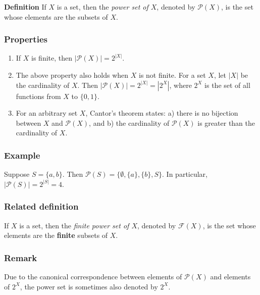 \documentclass[12pt]{article}
\newcommand{\powset}[1]{\mathcal{P}(#1)}
\begin{document}
{\bf Definition}
If $X$ is a set, then the \emph{power set of $X$}, denoted by  $\powset{X}$, is the
set whose elements are the subsets of $X$. 

\subsubsection*{Properties}
\begin{enumerate}
\item If $X$ is finite, then $|\powset{X}|=2^{|X|}$.
\item The above property also holds when $X$ is not finite. 
For a set $X$, let $|X|$ be the cardinality of $X$. 
Then $|\powset{X}|=2^{|X|}=|2^X|$,
where $2^X$ is the set of all functions from $X$ to $\{0,1\}$.
\item For an arbitrary set $X$, Cantor's theorem states:
a) there is no bijection between $X$ and $\powset{X}$, and
b) the cardinality of $\powset{X}$ is greater than the cardinality of $X$.
\end{enumerate}

\subsubsection*{Example}
Suppose $S=\{a,b\}$. Then $\powset{S}=\{\emptyset, \{a\}, \{b\}, S\}$.
In particular, $|\powset{S}|=2^{|S|}=4$. 

\subsubsection*{Related definition}
If $X$ is a set, then the \emph{finite power set of $X$}, denoted by  $\mathcal{F}(X)$, is the
set whose elements are the {\bf finite} subsets of $X$. 

\subsubsection*{Remark}
Due to the canonical correspondence between elements of $\powset{X}$ and elements of $2^X$, the power set is sometimes also denoted by $2^X$.
\end{document}
